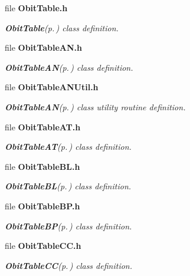 \begin{CompactItemize}
\item 
file {\bf Obit\-Table.h}
\begin{CompactList}\small\item\em {\bf Obit\-Table}{\rm (p.\,\pageref{structObitTable})} class definition. \item\end{CompactList}

\item 
file {\bf Obit\-Table\-AN.h}
\begin{CompactList}\small\item\em {\bf Obit\-Table\-AN}{\rm (p.\,\pageref{structObitTableAN})} class definition. \item\end{CompactList}

\item 
file {\bf Obit\-Table\-ANUtil.h}
\begin{CompactList}\small\item\em {\bf Obit\-Table\-AN}{\rm (p.\,\pageref{structObitTableAN})} class utility routine definition. \item\end{CompactList}

\item 
file {\bf Obit\-Table\-AT.h}
\begin{CompactList}\small\item\em {\bf Obit\-Table\-AT}{\rm (p.\,\pageref{structObitTableAT})} class definition. \item\end{CompactList}

\item 
file {\bf Obit\-Table\-BL.h}
\begin{CompactList}\small\item\em {\bf Obit\-Table\-BL}{\rm (p.\,\pageref{structObitTableBL})} class definition. \item\end{CompactList}

\item 
file {\bf Obit\-Table\-BP.h}
\begin{CompactList}\small\item\em {\bf Obit\-Table\-BP}{\rm (p.\,\pageref{structObitTableBP})} class definition. \item\end{CompactList}

\item 
file {\bf Obit\-Table\-CC.h}
\begin{CompactList}\small\item\em {\bf Obit\-Table\-CC}{\rm (p.\,\pageref{structObitTableCC})} class definition. \item\end{CompactList}


\end{CompactItemize}
